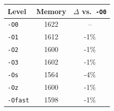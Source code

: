 \begin{tabular*}{\columnwidth}{@{\extracolsep\fill}lcc@{\extracolsep\fill}}
\toprule
\textbf{Level} & \textbf{Memory} & \textbf{$\Delta$ vs.\ \texttt{-O0}} \\
\midrule
\texttt{-O0} & 1622 & -- \\
\texttt{-O1} & 1612 & -1\% \\
\texttt{-O2} & 1600 & -1\% \\
\texttt{-O3} & 1602 & -1\% \\
\texttt{-Os} & 1564 & -4\% \\
\texttt{-Oz} & 1600 & -1\% \\
\texttt{-Ofast} & 1598 & -1\% \\
\bottomrule
\end{tabular*}
